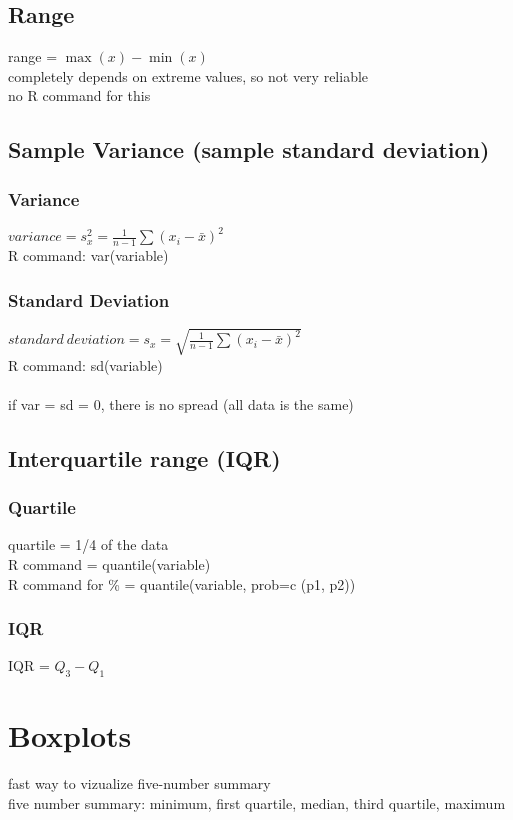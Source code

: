 \documentclass{report}
\begin{document}
    \subsection{Range}
    range = $\max(x)-\min(x)$\\
    completely depends on extreme values, so not very reliable\\
    no R command for this

    \subsection{Sample Variance (sample standard deviation)}
      \subsubsection{Variance}
      $variance=s^2_x=\frac{1}{n-1}\sum(x_i-\bar{x})^2$\\
      R command: var(variable)
      \subsubsection{Standard Deviation}
      $standard\ deviation=s_x=\sqrt{\frac{1}{n-1}\sum(x_i-\bar{x})^2}$\\
      R command: sd(variable)\\\\
      if var = sd = 0, there is no spread (all data is the same)

	\subsection{Interquartile range (IQR)}
    \subsubsection{Quartile}
    quartile = 1/4 of the data\\
    R command = quantile(variable)\\
    R command for \% = quantile(variable, prob=c (p1, p2)) 

    \subsubsection{IQR}
    IQR = $Q_3-Q_1$\\

	\section{Boxplots}
	fast way to vizualize five-number summary\\
	five number summary: minimum, first quartile, median, third quartile, maximum
\end{document}
